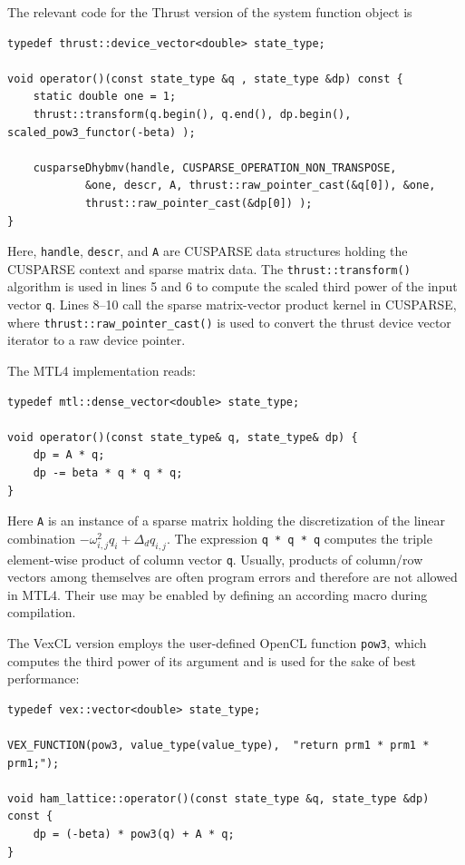 \documentclass[final]{siamltex}
\newcommand{\code}[1]{\lstinline|#1|}
\begin{document}
The relevant code for the Thrust version of the system function object is
\begin{lstlisting}
typedef thrust::device_vector<double> state_type;

void operator()(const state_type &q , state_type &dp) const {
    static double one = 1;
    thrust::transform(q.begin(), q.end(), dp.begin(), scaled_pow3_functor(-beta) );

    cusparseDhybmv(handle, CUSPARSE_OPERATION_NON_TRANSPOSE,
            &one, descr, A, thrust::raw_pointer_cast(&q[0]), &one,
            thrust::raw_pointer_cast(&dp[0]) );
}
\end{lstlisting}
Here, \code{handle}, \code{descr}, and \code{A} are CUSPARSE data structures
holding the CUSPARSE context and sparse matrix data. The
\code{thrust::transform()} algorithm is used in lines 5 and 6 to compute the
scaled third power of the input vector \code{q}. Lines 8--10 call the sparse
matrix-vector product kernel in CUSPARSE, where
\code{thrust::raw_pointer_cast()} is used to convert the thrust device vector
iterator to a raw device pointer.

The MTL4 implementation reads:
\begin{lstlisting}
typedef mtl::dense_vector<double> state_type;

void operator()(const state_type& q, state_type& dp) {
    dp = A * q;
    dp -= beta * q * q * q;
}
\end{lstlisting}
Here \code{A} is an instance of a sparse matrix holding the discretization of
the linear combination $- \omega_{i,j}^2 q_i + \Delta_d q_{i,j}$. The
expression \code{q * q * q} computes the triple element-wise product of column
vector \code{q}.  Usually, products of column/row vectors among themselves are
often program errors and therefore are not allowed in MTL4.  Their use may be
enabled by defining an according macro during compilation.

The VexCL version employs the user-defined OpenCL function \code{pow3}, which
computes the third power of its argument and is used for the sake of best
performance:
\begin{lstlisting}
typedef vex::vector<double> state_type;

VEX_FUNCTION(pow3, value_type(value_type),  "return prm1 * prm1 * prm1;");

void ham_lattice::operator()(const state_type &q, state_type &dp) const {
    dp = (-beta) * pow3(q) + A * q;
}
\end{lstlisting}
\end{document}
